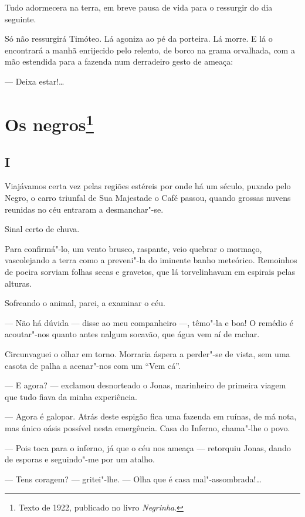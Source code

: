 Tudo adormecera na terra, em breve pausa de vida para o ressurgir do dia
seguinte.

Só não ressurgirá Timóteo. Lá agoniza ao pé da porteira. Lá morre. E lá
o encontrará a manhã enrijecido pelo relento, de borco na grama
orvalhada, com a mão estendida para a fazenda num derradeiro gesto de
ameaça:

--- Deixa estar!\ldots{}

\chapter{Os negros\footnote[*]{Texto de 1922, publicado no livro \emph{Negrinha}.}}

\section*{I}

Viajávamos certa vez pelas regiões estéreis por onde há um século,
puxado pelo Negro, o carro triunfal de Sua Majestade o Café passou,
quando grossas nuvens reunidas no céu entraram a desmanchar"-se.

Sinal certo de chuva.

Para confirmá"-lo, um vento brusco, raspante, veio quebrar o mormaço,
vascolejando a terra como a preveni"-la do iminente banho meteórico.
Remoinhos de poeira sorviam folhas secas e gravetos, que lá
torvelinhavam em espirais pelas alturas.

Sofreando o animal, parei, a examinar o céu.

--- Não há dúvida --- disse ao meu companheiro ---, têmo"-la e boa! O
remédio é acoutar"-nos quanto antes nalgum socavão, que água vem aí de
rachar.

Circunvaguei o olhar em torno. Morraria áspera a perder"-se de vista, sem
uma casota de palha a acenar"-nos com um ``Vem cá''.

--- E agora? --- exclamou desnorteado o Jonas, marinheiro de primeira
viagem que tudo fiava da minha experiência.

--- Agora é galopar. Atrás deste espigão fica uma fazenda em ruínas, de
má nota, mas único oásis possível nesta emergência. Casa do Inferno,
chama"-lhe o povo.

--- Pois toca para o inferno, já que o céu nos ameaça --- retorquiu
Jonas, dando de esporas e seguindo"-me por um atalho.

--- Tens coragem? --- gritei"-lhe. --- Olha que é casa mal"-assombrada!\ldots{}

